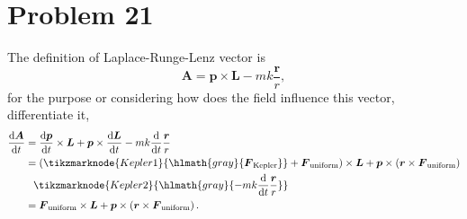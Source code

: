 \section*{Problem 21}

    The definition of Laplace-Runge-Lenz vector is
    \begin{equation}
        \boldsymbol{A} = \boldsymbol{p} \times \boldsymbol{L} -mk\frac{\boldsymbol{r}}{r},
    \end{equation}
    for the purpose or considering how does the field influence this vector, differentiate it,
    \begin{align}
        \frac{\mathrm{d}\boldsymbol{A}}{\mathrm{d}t} &= \frac{\mathrm{d}\boldsymbol{p}}{\mathrm{d}t}\times\boldsymbol{L} + \boldsymbol{p}\times\frac{\mathrm{d}\boldsymbol{L}}{\mathrm{d}t} - mk\frac{\mathrm{d}}{\mathrm{d}t}\frac{\boldsymbol{r}}{r}\nonumber
        \\
        & = \left( \tikzmarknode{Kepler1}{\hlmath{gray}{\boldsymbol{F}_{\text{Kepler}}}} + \boldsymbol{F}_{\text{uniform}} \right)\times\boldsymbol{L} + \boldsymbol{p}\times\left(\boldsymbol{r}\times\boldsymbol{F}_{\text{uniform}}\right)\nonumber
        \\
        &\phantom{=}\tikzmarknode{Kepler2}{\hlmath{gray}{- mk\frac{\mathrm{d}}{\mathrm{d}t}\frac{\boldsymbol{r}}{r}}}\nonumber
        \\
        & = \boldsymbol{F}_{\text{uniform}}\times\boldsymbol{L} + \boldsymbol{p}\times\left(\boldsymbol{r}\times\boldsymbol{F}_{\text{uniform}}\right).
    \end{align}
